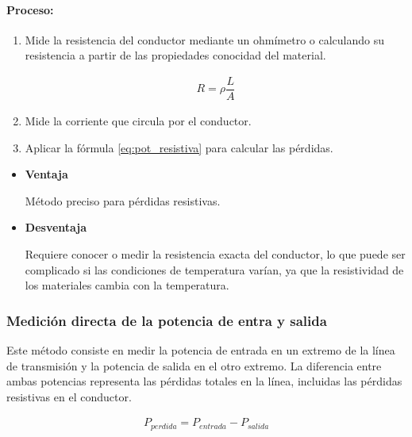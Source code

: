             \paragraph{Proceso:}
                \begin{enumerate}
                    \item Mide la resistencia del conductor mediante un ohmímetro o calculando su resistencia a partir de las propiedades conocidad del material.

                    \begin{gather}
                        R = \rho \dfrac{L}{A} \label{eq:rho}
                    \end{gather}

                    \item Mide la corriente que circula por el conductor.

                    \item Aplicar la fórmula \ref{eq:pot_resistiva} para calcular las pérdidas.
                \end{enumerate}

            \begin{itemize}
                \item \textbf{Ventaja}

                    Método preciso para pérdidas resistivas.

                \item \textbf{Desventaja}

                    Requiere conocer o medir la resistencia exacta del conductor, lo que puede ser complicado si las condiciones de temperatura varían, ya que la resistividad de los materiales cambia con la temperatura.
            \end{itemize}

        \subsubsection{Medición directa de la potencia de entra y salida}

            Este método consiste en medir la potencia de entrada en un extremo de la línea de transmisión y la potencia de salida en el otro extremo. La diferencia entre ambas potencias representa las pérdidas totales en la línea, incluidas las pérdidas resistivas en el conductor.

            \begin{gather}
                P_{perdida} = P_{entrada} - P_{salida} \label{eq:pot_perdida_2}
            \end{gather}

